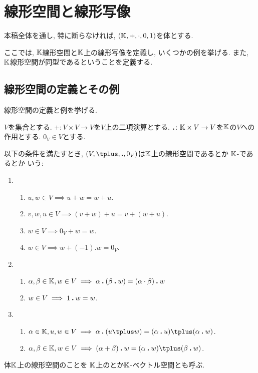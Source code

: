\chapter{線形空間と線形写像}
\label{chap:linspace:linmap}
本稿全体を通し,
特に断らなければ,
$(\mathbb{K},+,\cdot,0,1)$を体とする.

ここでは, $\mathbb{K}$線形空間と$\mathbb{K}$上の線形写像を定義し,
いくつかの例を挙げる.
また, $\mathbb{K}$線形空間が同型であるということを定義する.

\section{線形空間の定義とその例}
\label{sec:linspace:def}

線形空間の定義と例を挙げる.

\begin{definition}
\label{def:vecsp}
  $V$を集合とする.
  $\plus\colon V\times V \to V$を$V$上の二項演算とする.
  $\mathbin{\boldsymbol{.}} \colon \mathbb{K}\times V \to V$を$\mathbb{K}$の$V$への作用とする.
  $0_V \in V$とする.

  以下の条件を満たすとき,
  $(V,\plus,\act ,0_V)$は$\mathbb{K}$上の線形空間であるとか
  $\mathbb{K}$-であるとか
  いう:
  \begin{enumerate}
  \item 
    \begin{enumerate}
      \label{def:vecsp:item:com}
    \item $u,w \in V\implies  u\plus w=w\plus u$.
    \item
      \label{def:vecsp:item:sum:ass}
      $v,w,u\in V \implies (v\plus w)\plus u=v\plus (w\plus u)$.
    \item $w\in V \implies 0_V\plus w=w$.
    \item $w\in V\implies w\plus (-1).w=0_V$.%
    \end{enumerate}
  \item
    \begin{enumerate}
    \item
      \label{def:vecsp:item:prod:ass}
      $\alpha,\beta\in\mathbb{K}, w\in V \implies \alpha\mathbin{\boldsymbol{.}} (\beta \mathbin{\boldsymbol{.}} w)=(\alpha\cdot \beta)\mathbin{\boldsymbol{.}} w$
    \item $w\in V \implies 1\mathbin{\boldsymbol{.}} w=w$.
    \end{enumerate}
  \item
    \begin{enumerate}
    \item
      \label{def:vecsp:item:dist:r}
$\alpha\in \KK,u,w\in V \implies \alpha\act (u\plus w)=(\alpha\act u)\plus (\alpha\act w)$.
    \item
      \label{def:vecsp:item:dist:l}
$\alpha,\beta\in\KK, w\in V\implies (\alpha+\beta)\act w=(\alpha\act w)\plus (\beta\act w)$.
    \end{enumerate}
  \end{enumerate}
体$\mathbb{K}$上の線形空間のことを
$\mathbb{K}$上のとか$\mathbb{K}$-ベクトル空間とも呼ぶ.
\end{definition}
